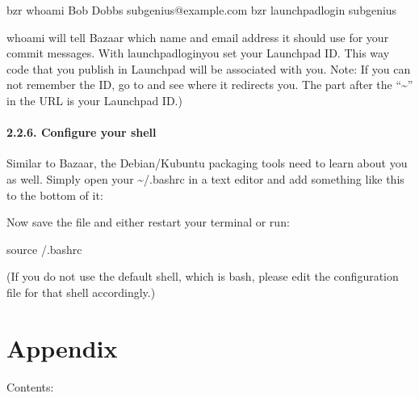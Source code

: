 \documentclass[letterpaper,10pt,english]{sphinxmanual}
\begin{document}
\begin{sphinxVerbatim}[commandchars=\\\{\}]
\PYGZdl{} bzr whoami \PYGZdq{}Bob Dobbs \PYGZlt{}subgenius@example.com\PYGZgt{}\PYGZdq{}
\PYGZdl{} bzr launchpad\PYGZhy{}login subgenius
\end{sphinxVerbatim}

\sphinxAtStartPar
whoami will tell Bazaar which name and email address it should use for your commit messages. With launchpad\sphinxhyphen{}loginyou set your Launchpad ID. This way code that you publish in Launchpad will be associated with you.
Note: If you can not remember the ID, go to  and see where it redirects you. The part after the “\textasciitilde{}” in the URL is your Launchpad ID.)


\subsubsection{2.2.6. Configure your shell}
\label{\detokenize{docs/packaging_guide/getting_started:configure-your-shell}}
\sphinxAtStartPar
Similar to Bazaar, the Debian/Kubuntu packaging tools need to learn about you as well. Simply open your \textasciitilde{}/.bashrc in a text editor and add something like this to the bottom of it:

\begin{sphinxVerbatim}[commandchars=\\\{\}]
 
 
\end{sphinxVerbatim}

\sphinxAtStartPar
Now save the file and either restart your terminal or run:

\begin{sphinxVerbatim}[commandchars=\\\{\}]
\PYGZdl{} source \PYGZti{}/.bashrc
\end{sphinxVerbatim}

\sphinxAtStartPar
(If you do not use the default shell, which is bash, please edit the configuration file for that shell accordingly.)


\chapter{Appendix}
\label{\detokenize{docs/appendix/appendix:appendix}}\label{\detokenize{docs/appendix/appendix::doc}}
\sphinxAtStartPar
Contents:
\end{document}
